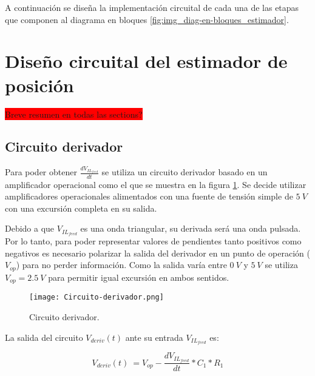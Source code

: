 A continuación se diseña la implementación circuital de cada una de las etapas que componen al diagrama en bloques \ref{fig:img_diag-en-bloques_estimador}.

{
	
}


\section{Diseño circuital del estimador de posición}
\colorbox{red}{Breve resumen en todas las sections?}

\subsection{Circuito derivador}

Para poder obtener $\frac{dV_{IL_{feed}}}{dt}$ se utiliza un circuito derivador basado en un amplificador operacional como el que se muestra en la figura \ref{fig:img_Circuito-derivador}. Se decide utilizar amplificadores operacionales alimentados con una fuente de tensión simple de $5\:V$ con una excursión completa en su salida. 

Debido a que $V_{IL_{feed}}$ es una onda triangular, su derivada será una onda pulsada. Por lo tanto, para poder representar valores de pendientes tanto positivos como negativos es necesario polarizar la salida del derivador en un punto de operación ($V_{op}$) para no perder información. Como la salida varía entre $0\:V$ y $5\:V$ se utiliza $V_{op}=2.5\:V$ para permitir igual excursión en ambos sentidos.

\begin{figure}[H]
	\centering
	\texttt{[image: Circuito-derivador.png]}
	\caption{Circuito derivador.}
	\label{fig:img_Circuito-derivador}
\end{figure}


La salida del circuito $V_{deriv}(t)$ ante su entrada $V_{IL_{feed}}$ es:

\begin{equation} 
	V_{deriv}(t)\ = V_{op} - \frac{dV_{IL_{feed}}}{dt}*C_1*R_1
\end{equation}

